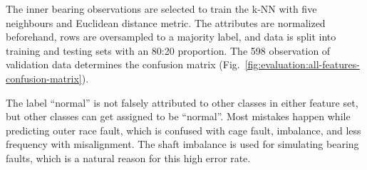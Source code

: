 The inner bearing observations are selected to train the k-NN with five neighbours and Euclidean distance metric. The attributes are normalized beforehand, rows are oversampled to a majority label, and data is split into training and testing sets with an 80:20 proportion. The 598 observation of validation data determines the confusion matrix (Fig.~\ref{fig:evaluation:all-features-confusion-matrix}). 

The label ``normal'' is not falsely attributed to other classes in either feature set, but other classes can get assigned to be ``normal''. Most mistakes happen while predicting outer race fault, which is confused with cage fault, imbalance, and less frequency with misalignment. The shaft imbalance is used for simulating bearing faults, which is a natural reason for this high error rate.

